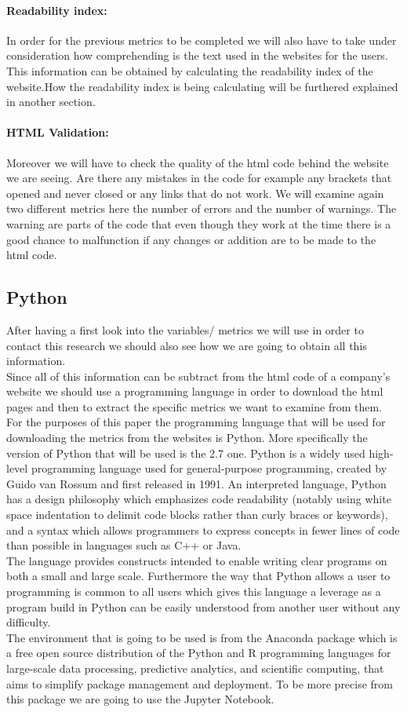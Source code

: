 \documentclass{article}
\begin{document}
\paragraph{Readability index:}In order for the previous metrics to be completed we will also have to take under consideration how comprehending is the text used in the websites for the users. This information can be obtained by calculating the readability index of the website.How the readability index is being calculating will be furthered explained in another section.
\paragraph{HTML Validation:} Moreover we will have to check the quality of the html code behind the website we are seeing. Are there any mistakes in the code for example any brackets that opened and never closed or any links that do not work. We will examine again two different metrics here the number of errors and the number of warnings. The warning are parts of the code that even though they work at the time there is a good chance to malfunction if any changes or addition are to be made to the html code. 
\subsection{Python}
After having a first look into the variables/ metrics we will use in order to contact this research we should also see how we are going to obtain all this information.\\
Since all of this information can be subtract from the html code of a company's website we should use a programming language in order to download the html pages and then to extract the specific metrics we want to examine from them.\\
For the purposes of this paper the programming language that will be used for downloading the metrics from the websites is Python. More specifically the version of Python that will be used is the 2.7 one. Python is a widely used high-level programming language used for general-purpose programming, created by Guido van Rossum and first released in 1991. An interpreted language, Python has a design philosophy which emphasizes code readability (notably using white space indentation to delimit code blocks rather than curly braces or keywords), and a syntax which allows programmers to express concepts in fewer lines of code than possible in languages such as C++ or Java. \\
The language provides constructs intended to enable writing clear programs on both a small and large scale. Furthermore the way that Python allows a user to programming is common to all users which gives this language a leverage as a program build in Python can be easily understood from another user without any difficulty.\\
The environment that is going to be used is from the Anaconda package which is a free open source distribution of the Python and R programming languages for large-scale data processing, predictive analytics, and scientific computing, that aims to simplify package management and deployment. To be more precise from this package we are going to use the Jupyter Notebook.\cite{key4} \\
\end{document}
